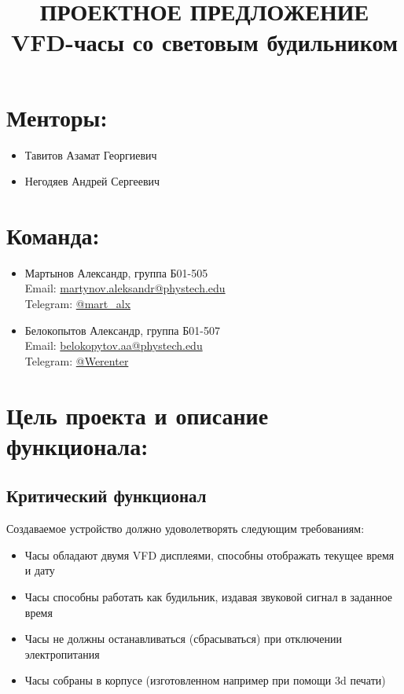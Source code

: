 \documentclass[a4paper,14pt]{extarticle}
\title{\huge \textbf{ПРОЕКТНОЕ ПРЕДЛОЖЕНИЕ}\\\large VFD-часы со световым будильником}
\date{}
\begin{document}
\maketitle

\section{Менторы:}

\begin{itemize}
	\item Тавитов Азамат Георгиевич
	\item Негодяев Андрей Сергеевич
\end{itemize}


\section{Команда:}

\begin{itemize}
	\item Мартынов Александр, группа Б01-505\\
	Email:
	\href{mailto:martynov.aleksandr@phystech.edu}{martynov.aleksandr@phystech.edu}\\
	Telegram:
	\href{https://t.me/mart_alx}{@mart\_alx}

	\item Белокопытов Александр, группа Б01-507\\
	Email:
	\href{mailto:belokopytov.aa@phystech.edu}{belokopytov.aa@phystech.edu}\\
	Telegram:
	\href{https://t.me/Werenter}{@Werenter}	
\end{itemize}

\section{Цель проекта и описание функционала:}

\subsection{Критический функционал}

Создаваемое устройство должно удоволетворять следующим требованиям:
\begin{itemize}
	\item
		Часы обладают двумя VFD дисплеями, способны отображать
		текущее время и дату
	\item
		Часы способны работать как будильник,
		издавая звуковой сигнал в заданное время
	\item
		Часы не должны останавливаться (сбрасываться)
		при отключении электропитания
	\item
		Часы собраны в корпусе (изготовленном например при
		помощи 3d печати)
\end{itemize}
\end{document}
